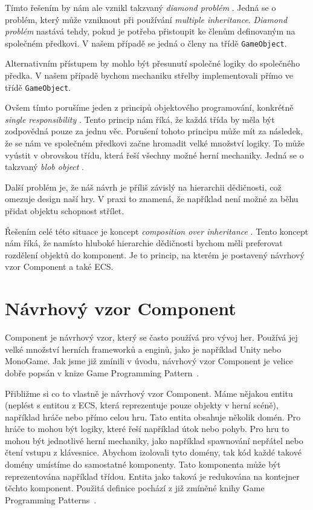 Tímto řešením by nám ale vznikl takzvaný \textit{diamond problém} . Jedná se o problém, který může vzniknout při používání \textit{multiple inheritance}. \textit{Diamond problém} nastává tehdy, pokud je potřeba přistoupit ke členům definovaným na společném předkovi. V našem případě se jedná o členy na třídě \verb|GameObject|.

Alternativním přístupem by mohlo být přesunutí společné logiky do společného předka. V našem případě bychom mechaniku střelby implementovali přímo ve třídě \verb|GameObject|.

Ovšem tímto porušíme jeden z principů objektového programování, konkrétně \textit{single responsibility} . Tento princip nám říká, že každá třída by měla být zodpovědná pouze za jednu věc. Porušení tohoto principu může mít za následek, že se nám ve společném předkovi začne hromadit velké množství logiky. To může vyústit v obrovskou třídu, která řeší všechny možné herní mechaniky. Jedná se o takzvaný \textit{blob object} . 

Další problém je, že náš návrh je příliš závislý na hierarchii dědičnosti, což omezuje design naší hry. V praxi to znamená, že například není možné za běhu přidat objektu schopnost střílet.

Řešením celé této situace je koncept \textit{composition over inheritance} . Tento koncept nám říká, že namísto hluboké hierarchie dědičnosti bychom měli preferovat rozdělení objektů do komponent. Je to princip, na kterém je postavený návrhový vzor Component a také ECS.

\section{Návrhový vzor Component}
\label{sec:component}
Component je návrhový vzor, který se často používá pro vývoj her. Používá jej velké množství herních frameworků a enginů, jako je například Unity nebo MonoGame. Jak jsme již zmínili v úvodu, návrhový vzor Component je velice dobře popsán v knize Game Programming Pattern~\cite{nystrom2014game}.

Přibližme si co to vlastně je návrhový vzor Component. Máme nějakou entitu (neplést s entitou z ECS, která reprezentuje pouze objekty v herní scéně), například hráče nebo přímo celou hru. Tato entita obsahuje několik domén. Pro hráče to mohou být logiky, které řeší například útok nebo pohyb. Pro hru to mohou být jednotlivé herní mechaniky, jako například spawnování nepřátel nebo čtení vstupu z klávesnice. Abychom izolovali tyto domény, tak kód každé takové domény umístíme do samostatné komponenty. Tato komponenta může být reprezentována například třídou. Entita jako taková je redukována na kontejner těchto komponent. Použitá definice pochází z již zmíněné knihy Game Programming Patterns~\cite{nystrom2014game}.


